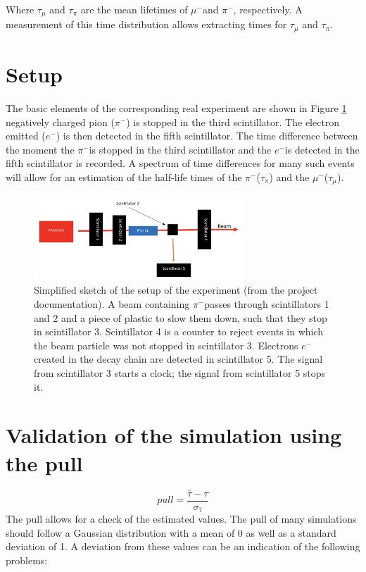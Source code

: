 \documentclass[11pt, a4paper, oneside]{book}
\newcommand{\electron}{$e^{-}$}
\newcommand{\pion}{$\pi^{-}$}
\newcommand{\muon}{$\mu^{-}$}
\begin{document}
Where $\tau_{\mu}$ and $\tau_{\pi}$ are the mean lifetimes of \muon and \pion, respectively. A measurement of this time distribution allows extracting times for $\tau_{\mu}$ and $\tau_{\pi}$.

\section{Setup}

The basic elements of the corresponding real experiment are shown in Figure \ref{fig:experimental_setup} negatively charged pion (\pion) is stopped in the third scintillator. The electron emitted (\electron) is then detected in the fifth scintillator. The time difference between the moment the \pion is stopped in the third scintillator and the \electron is detected in the fifth scintillator is recorded. A spectrum of time differences for many such events will allow for an estimation of the half-life times of the \pion ($\tau_{\pi}$) and the \muon ($\tau_{\mu}$).

\begin{figure}[h]
\begin{center}
\includegraphics[width=0.7\textwidth]{images/experimental_setup.png}
\end{center}
\caption{Simplified sketch of the setup of the experiment (from the project documentation). A beam containing \pion passes through scintillators 1 and 2 and a piece of plastic to slow them down, such that they stop in scintillator 3. Scintillator 4 is a counter to reject events in which the beam particle was not stopped in scintillator 3. Electrons \electron created in the decay chain are detected in scintillator 5. The signal from scintillator 3 starts a clock; the signal from scintillator 5 stops it.}
\label{fig:experimental_setup}
\end{figure}

\section{Validation of the simulation using the pull}
\begin{equation}
    \si{pull} = \frac{\bar{\tau} - \tau}{\sigma_{\bar{\tau}}}
    \label{eq:pull}
\end{equation}
The pull allows for a check of the estimated values. The pull of many simulations should follow a Gaussian distribution with a mean of 0 as well as a standard deviation of 1. A deviation from these values can be an indication of the following problems:
\end{document}
